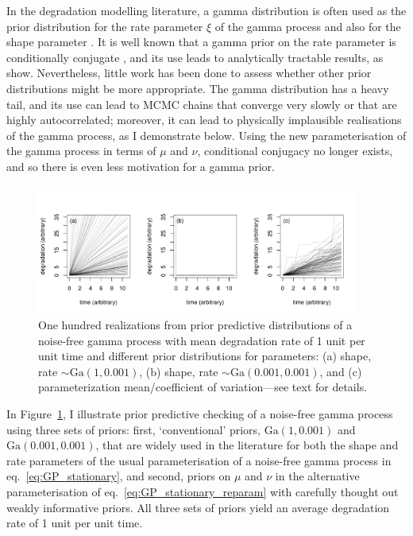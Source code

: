 In the degradation modelling literature, a gamma distribution is often used as the prior distribution for the rate parameter $\xi$ of the gamma process \citep{lawless2004} and also for the shape parameter \citep{rodriguez-picon2018}. It is well known that a gamma prior on the rate parameter is conditionally conjugate \citep{pradhan2011}, and its use leads to analytically tractable results, as \citet{lawless2004} show. Nevertheless, little work has been done to assess whether other prior distributions might be more appropriate. The gamma distribution has a heavy tail, and its use can lead to MCMC chains that converge very slowly or that are highly autocorrelated; moreover, it can lead to physically implausible realisations of the gamma process, as I demonstrate below. Using the new parameterisation of the gamma process in terms of $\mu$ and $\nu$, conditional conjugacy no longer exists, and so there is even less motivation for a gamma prior.

\begin{figure}[tbp]
  \centering
  \includegraphics[width=0.95\textwidth]{./figures/ch-4/PPCs.pdf}
  \caption{One hundred realizations from prior predictive distributions of a noise-free gamma process with mean degradation rate of 1 unit per unit time and different prior distributions for parameters: (a) shape, rate $\sim \mbox{Ga}(1, 0.001)$, (b) shape, rate $\sim \mbox{Ga}(0.001, 0.001)$, and (c) parameterization mean/coefficient of variation---see text for details.}
  \label{fig:ppc}
\end{figure}

In Figure~\ref{fig:ppc}, I illustrate prior predictive checking of a noise-free gamma process using three sets of priors: first, `conventional' priors, $\mbox{Ga}(1, 0.001)$ and $\mbox{Ga}(0.001, 0.001)$, that are widely used in the literature for both the shape and rate parameters of the usual parameterisation of a noise-free gamma process in eq.~\eqref{eq:GP_stationary}, and second, priors on $\mu$ and $\nu$ in the alternative parameterisation of eq.~\eqref{eq:GP_stationary_reparam} with carefully thought out weakly informative priors. All three sets of priors yield an average degradation rate of 1 unit per unit time. 

